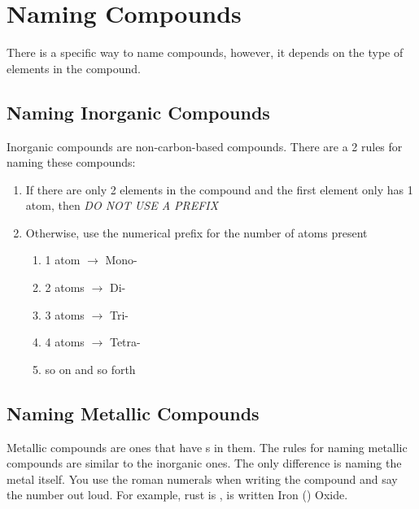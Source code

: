 \section{Naming Compounds} \label{sec:Naming Compounds}
There is a specific way to name compounds, however, it depends on the type of elements in the compound.

\subsection{Naming Inorganic Compounds} \label{subsec:Naming Inorganic Compounds}
Inorganic compounds are non-carbon-based compounds.
There are a 2 rules for naming these compounds:
\begin{enumerate}
\item If there are only 2 elements in the compound and the first element only has 1 atom, then \emph{DO NOT USE A PREFIX}
\item Otherwise, use the numerical prefix for the number of atoms present
  \begin{enumerate}
  \item 1 atom $\rightarrow$ Mono-
  \item 2 atoms $\rightarrow$ Di-
  \item 3 atoms $\rightarrow$ Tri-
  \item 4 atoms $\rightarrow$ Tetra-
  \item so on and so forth
  \end{enumerate}
\end{enumerate}

\subsection{Naming Metallic Compounds} \label{subsec:Naming Metallic Compounds}
Metallic compounds are ones that have s in them.
The rules for naming metallic compounds are similar to the inorganic ones.
The only difference is naming the metal itself.
You use the roman numerals when writing the compound and say the number out loud.
For example, rust is , is written Iron () Oxide.